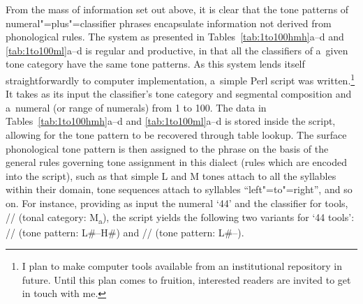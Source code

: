 From the mass of information set out above, it is clear that the tone patterns of
numeral"=plus"=classifier phrases encapsulate information not derived from phonological rules. The
system as presented in Tables~\ref{tab:1to100hmh}a--d and \ref{tab:1to100ml}a--d is regular and productive, in that all the classifiers of a~given
tone category have the same tone patterns. As this system lends itself straightforwardly to computer
implementation, a~simple Perl script was written.\footnote{I plan to make computer tools available from an institutional repository in future. Until this plan comes to fruition, interested readers are invited to get in touch with me.} It takes as its input
the classifier’s tone category and segmental composition and a~numeral (or range of numerals) from 1
to 100. The data in Tables~\ref{tab:1to100hmh}a--d and \ref{tab:1to100ml}a--d is stored inside the script, allowing for the tone pattern to be
recovered through table lookup. The surface phonological tone pattern is then assigned to the phrase
on the basis of the general rules governing tone assignment in this dialect (rules which are encoded into the
script), such as that simple L and M tones attach to all the syllables within their domain, tone
sequences attach to syllables “left"=to"=right”, and so on. For instance, providing as input the numeral ‘44’ and the
classifier for tools, // (tonal category: M\textsubscript{a}), the script yields the following
two variants for ‘44 tools’: // (tone pattern: L\#--H\#) and // (tone
pattern: L\#--).

